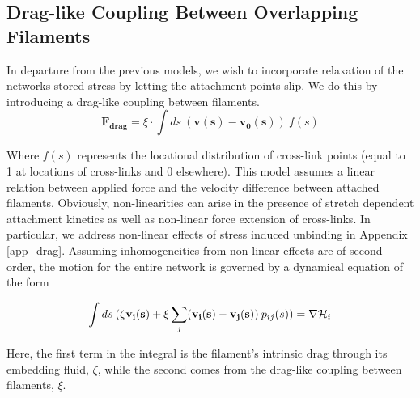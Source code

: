\documentclass[pre,preprint]{revtex4-1}
\begin{document}
\subsection{Drag-like Coupling Between Overlapping Filaments}
\label{exp_drag}
In departure from the previous models, we wish to incorporate relaxation of the networks stored stress by letting the attachment points slip.  We do this by introducing a drag-like coupling between filaments.
\begin{equation}
\mathbf{F_{drag}} = \xi \cdot \int ds \: (\mathbf{v(s)}-\mathbf{v_0(s)}) \: f(s)
\end{equation}

Where $f(s)$ represents the locational distribution of cross-link points (equal to 1 at locations of cross-links and 0 elsewhere).  This model assumes a linear relation between applied force and the velocity difference between attached filaments.  Obviously, non-linearities can arise in the presence of stretch dependent attachment kinetics as well as non-linear force extension of cross-links.  In particular, we address non-linear effects of stress induced unbinding in Appendix \ref{app_drag}.  Assuming inhomogeneities from non-linear effects are of second order, the motion for the entire network is governed by a dynamical equation of the form

\begin{equation}
\int ds \: (\mathbf{\zeta v_i(s)} + \xi \sum _j(\mathbf{v_i(s)}-\mathbf{v_j(s)}) \: p_{ij}(s))= \nabla {\cal H}_i
\end{equation}

Here, the first term in the integral is the filament's intrinsic drag through its embedding fluid, $\zeta$, while the second comes from the drag-like coupling between filaments, $\xi$.  

\end{document}
